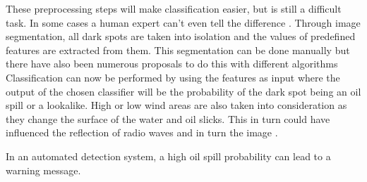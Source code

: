 These preprocessing steps will make classification easier, but is still a difficult task. In some cases a human expert can't even tell the difference \cite{Keramitsoglou2006640}. Through image segmentation, all dark spots are taken into isolation and the values of predefined features are extracted from them. This segmentation can be done manually but there have also been numerous proposals to do this with different algorithms \cite{ma2011sar,fjortoft1998optimal, ye2002wavelet} Classification can now be performed by using the features as input where the output of the chosen classifier will be the probability of the dark spot being an oil spill or a lookalike. 
High or low wind areas are also taken into consideration as they change the surface of the water and oil slicks. This in turn could have influenced the reflection of radio waves and in turn the image \cite{fingas2014review}.

In an automated detection system, a high oil spill probability can lead to a warning message.


